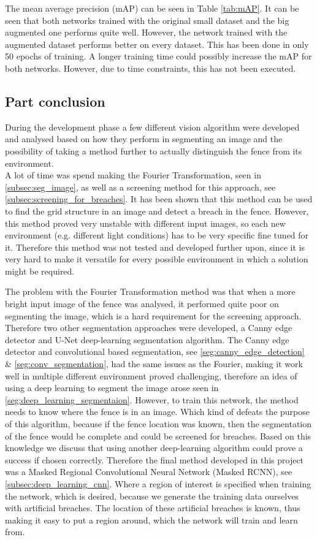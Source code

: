\documentclass[../Head/Main.tex]{subfiles}
\begin{document}
The mean average precision (mAP) can be seen in Table \ref{tab:mAP}. It can be seen that both networks trained with the original small dataset and the big augmented one performs quite well. However, the network trained with the augmented dataset performs better on every dataset. This has been done in only 50 epochs of training. A longer training time could possibly increase the mAP for both networks. However, due to time constraints, this has not been executed.    

\subsection{Part conclusion}
\label{subsec:part_conclusion}
During the development phase a few different vision algorithm were developed and analysed based on how they perform in segmenting an image and the possibility of taking a method further to actually distinguish the fence from its environment.\\  
A lot of time was spend making the Fourier Transformation, seen in \autoref{subsec:seg_image}, as well as a screening method for this approach, see \autoref{subsec:screening_for_breaches}. It has been shown that this method can be used to find the grid structure in an image and detect a breach in the fence. However, this method proved very unstable with different input images, so each new environment (e.g. different light conditions) has to be very specific fine tuned for it. Therefore this method was not tested and developed further upon, since it is very hard to make it versatile for every possible environment in which a solution might be required. \par
The problem with the Fourier Transformation method was that when a more bright input image of the fence was analysed, it performed quite poor on segmenting the image, which is a hard requirement for the screening approach. Therefore two other segmentation approaches were developed, a Canny edge detector and U-Net deep-learning segmentation algorithm. The Canny edge detector and convolutional based segmentation, see \autoref{seg:canny_edge_detection} \& \autoref{seg:conv_segmentation}, had the same issues as the Fourier, making it work well in multiple different environment proved challenging, therefore an idea of using a deep learning to segment the image arose seen in \autoref{seg:deep_learning_segmentaion}. However, to train this network, the method needs to know where the fence is in an image. Which kind of defeats the purpose of this algorithm, because if the fence location was known, then the segmentation of the fence would be complete and could be screened for breaches. Based on this knowledge we discuss that using another deep-learning algorithm could prove a success if chosen correctly. Therefore the final method developed in this project was a Masked Regional Convolutional Neural Network (Masked RCNN), see \autoref{subsec:deep_learning_cnn}. Where a region of interest is specified when training the network, which is desired, because we generate the training data ourselves with artificial breaches. The location of these artificial breaches is known, thus making it easy to put a region around, which the network will train and learn from.
\end{document}
